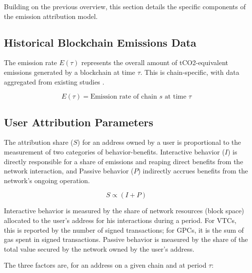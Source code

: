 \documentclass[11pt]{report}
\begin{document}
Building on the previous overview, this section details the specific components of the emission attribution model.

\subsection{Historical Blockchain Emissions Data}
The emission rate \(E(\tau)\) represents the overall amount of tCO2-equivalent emissions generated by a blockchain at time $\tau$. This is chain-specific, with data aggregated from existing studies \cite{neumuellerCambridgeBitcoinElectricity2021,stollCarbonFootprintBitcoin2019}.

\begin{equation}
    E(\tau) = \text{Emission rate of chain $s$ at time $\tau$}
    \label{eq:emission_rate}
\end{equation}


\subsection{User Attribution Parameters}

The attribution share ($S$) for an address owned by a user is proportional to the measurement of two categories of behavior-benefits. Interactive behavior ($I$) is directly responsible for a share of emissions and reaping direct benefits from the network interaction, and Passive behavior ($P$) indirectly accrues benefits from the network's ongoing operation.

\begin{equation}
    S \propto (I + P)
    \label{eq:attribution_share}
\end{equation}

Interactive behavior is measured by the share of network resources (block space) allocated to the user's address for his interactions during a period. For \ac{VTC}s, this is reported by the number of signed transactions; for \ac{GPC}s, it is the sum of gas spent in signed transactions. Passive behavior is measured by the share of the total value secured by the network owned by the user's address.

The three factors are, for an address on a given chain and at period $\tau$:
\end{document}
